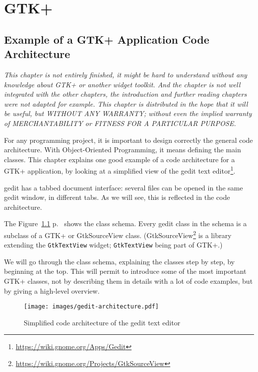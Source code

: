 \part{GTK+}
\chapter{Example of a GTK+ Application Code Architecture}
\label{gtk-app-arch}

\emph{This chapter is not entirely finished, it might be hard to understand without any knowledge about GTK+ or another widget toolkit. And the chapter is not well integrated with the other chapters, the introduction and further reading chapters were not adapted for example. This chapter is distributed in the hope that it will be useful, but WITHOUT ANY WARRANTY; without even the implied warranty of MERCHANTABILITY or FITNESS FOR A PARTICULAR PURPOSE.}


For any programming project, it is important to design correctly the general code architecture. With Object-Oriented Programming, it means defining the main classes. This chapter explains one good example of a code architecture for a GTK+ application, by looking at a simplified view of the gedit text editor\footnote{\url{https://wiki.gnome.org/Apps/Gedit}}.

gedit has a tabbed document interface: several files can be opened in the same gedit window, in different tabs. As we will see, this is reflected in the code architecture.

The Figure~\ref{fig:gedit-architecture} p.~\pageref{fig:gedit-architecture} shows the class schema. Every gedit class in the schema is a subclass of a GTK+ or GtkSourceView class. (GtkSourceView\footnote{\url{https://wiki.gnome.org/Projects/GtkSourceView}} is a library extending the \lstinline{GtkTextView} widget; \lstinline{GtkTextView} being part of GTK+.)

We will go through the class schema, explaining the classes step by step, by beginning at the top. This will permit to introduce some of the most important GTK+ classes, not by describing them in details with a lot of code examples, but by giving a high-level overview.

\begin{figure}
  \begin{center}
    \texttt{[image: images/gedit-architecture.pdf]}
    \caption{Simplified code architecture of the gedit text editor}
    \label{fig:gedit-architecture}
  \end{center}
\end{figure}

